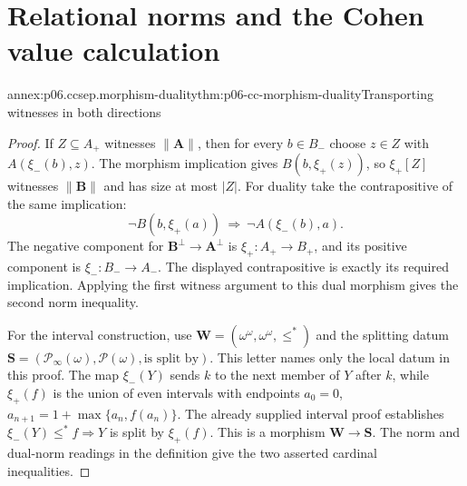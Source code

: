 \section{Relational norms and the Cohen value calculation}
\label{annex:p06-cardinal-characteristics-separations}

\begin{annexitem}{annex:p06.ccsep.morphism-duality}{thm:p06-cc-morphism-duality}{Transporting witnesses in both directions}
\begin{proof}
If \(Z\subseteq A_+\) witnesses \(\|\mathbf A\|\), then for every
\(b\in B_-\) choose \(z\in Z\) with \(A(\xi_-(b),z)\).
The morphism implication gives \(B(b,\xi_+(z))\), so
\(\xi_+[Z]\) witnesses \(\|\mathbf B\|\) and has size at most \(|Z|\).
For duality take the contrapositive of the same implication:
\[
 \neg B(b,\xi_+(a))\ \Longrightarrow\ \neg A(\xi_-(b),a).
\]
The negative component for \(\mathbf B^\perp\to \mathbf A^\perp\) is
\(\xi_+:A_+\to B_+\), and its positive component is
\(\xi_-:B_-\to A_-\). The displayed contrapositive is exactly
its required implication. Applying the first witness argument to this
dual morphism gives the second norm inequality.

For the interval construction, use
\(\mathbf W=(\omega^\omega,\omega^\omega,\leq^*)\) and the splitting
datum \(\mathbf S=(\mathcal P_\infty(\omega),\mathcal P(\omega),
\text{is split by})\). This letter names only the local datum in this proof.
The map \(\xi_-(Y)\) sends \(k\) to the next member
of \(Y\) after \(k\), while \(\xi_+(f)\) is the union of even
intervals with endpoints \(a_0=0\),
\(a_{n+1}=1+\max\{a_n,f(a_n)\}\).
The already supplied interval proof establishes
\(\xi_-(Y)\leq^*f\Rightarrow Y\) is split by \(\xi_+(f)\).
This is a morphism \(\mathbf W\to\mathbf S\). The norm and dual-norm readings
in the definition give the two asserted cardinal inequalities.
\end{proof}
\end{annexitem}


